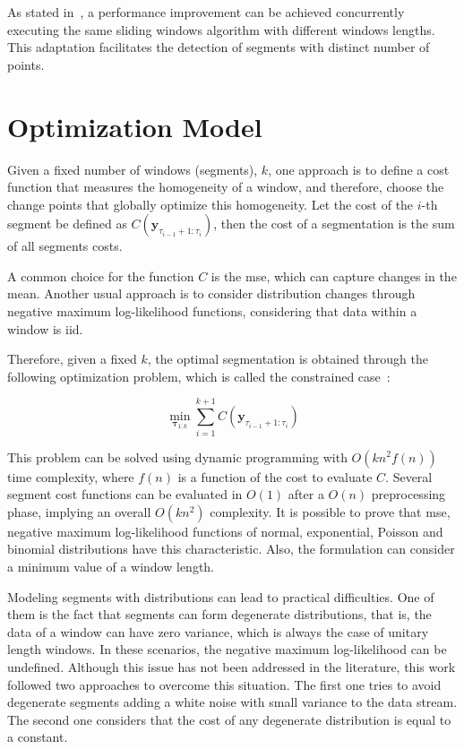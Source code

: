 As stated in~\cite{detecting_change_in_data_streams}, a performance improvement
can be achieved concurrently executing the same sliding windows algorithm with
different windows lengths. This adaptation facilitates the detection of
segments with distinct number of points.

\section{Optimization Model}

Given a fixed number of windows (segments), $k$, one approach is to define a
cost function that
measures the homogeneity of a window, and therefore, choose the change points
that globally optimize this homogeneity. Let the cost of the $i$-th segment be
defined as $C(\mathbf{y}_{\tau_{i - 1} + 1 : \tau_{i}})$, then the cost of a
segmentation is the sum of all segments costs.

A common choice for the function $C$ is the \gls*{mse}, which can
capture changes in the mean. Another usual approach is to consider distribution
changes through negative maximum log-likelihood functions, considering that data
within a window is iid.

Therefore, given a fixed $k$, the optimal segmentation is obtained through the
following optimization problem, which is called the constrained
case~\cite{on_optimal_multiple_changepoint_algorithms_for_large_data}:

\begin{equation}
    \min_{\boldsymbol \tau_{1 : k}} \sum \limits_{i = 1}^{k + 1} C(\mathbf{y}_{\tau_{i - 1} + 1 : \tau_{i}})
\end{equation}

This problem can be solved using dynamic programming with $O(k n^2 f(n))$ time
complexity, where $f(n)$ is a function of the cost to evaluate $C$. Several
segment cost functions can be evaluated in $O(1)$ after a $O(n)$ preprocessing
phase, implying an overall $O(k n^2)$ complexity. It is possible to prove
that \gls*{mse}, negative maximum log-likelihood functions of normal, exponential,
Poisson and binomial distributions have this characteristic. Also, the
formulation can consider a minimum value of a window length.

Modeling segments with distributions can lead to practical difficulties. One of
them is the fact that segments can form degenerate distributions, that is, the
data of a window can have zero variance, which is always the case of unitary
length windows. In these scenarios, the negative maximum log-likelihood can be
undefined. Although this issue has not been addressed in the literature,
this work followed two approaches to overcome this situation. The first one
tries to avoid degenerate segments adding a white noise with small variance to
the data stream. The second one considers that the cost of any degenerate
distribution is equal to a constant.

